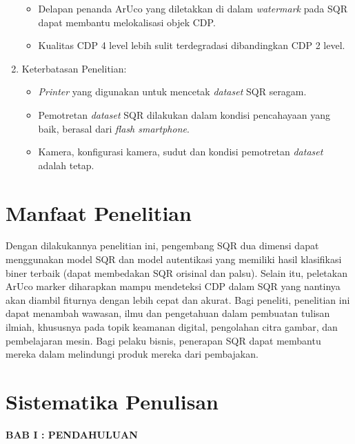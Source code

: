 \begin{enumerate}
\begin{itemize}
              \item Delapan penanda ArUco yang diletakkan di dalam \emph{watermark} pada SQR dapat membantu melokalisasi objek CDP.
              \item Kualitas CDP 4 level lebih sulit terdegradasi dibandingkan CDP 2 level.
          \end{itemize}
    \item Keterbatasan Penelitian:
          \begin{itemize}
              \item \emph{Printer} yang digunakan untuk mencetak \emph{dataset} SQR seragam.
              \item Pemotretan \emph{dataset} SQR dilakukan dalam kondisi pencahayaan yang baik, berasal dari \emph{flash smartphone}.
              \item Kamera, konfigurasi kamera, sudut dan kondisi pemotretan \emph{dataset} adalah tetap.
          \end{itemize}
\end{enumerate}

\section{Manfaat Penelitian}
Dengan dilakukannya penelitian ini, pengembang SQR dua dimensi dapat menggunakan model SQR dan model autentikasi yang memiliki hasil klasifikasi biner terbaik
(dapat membedakan SQR orisinal dan palsu). Selain itu, peletakan ArUco marker diharapkan mampu mendeteksi CDP dalam SQR yang nantinya akan diambil fiturnya
dengan lebih cepat dan akurat. Bagi peneliti, penelitian ini dapat menambah wawasan, ilmu dan pengetahuan dalam pembuatan tulisan ilmiah, khususnya pada topik
keamanan digital, pengolahan citra gambar, dan pembelajaran mesin. Bagi pelaku bisnis, penerapan SQR dapat membantu mereka dalam melindungi produk mereka dari
pembajakan.

\section{Sistematika Penulisan}
\noindent
\textbf{BAB I : PENDAHULUAN}

